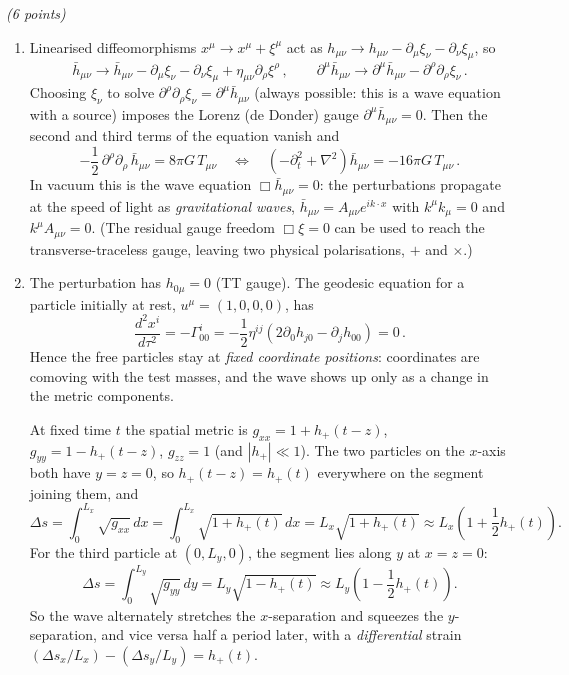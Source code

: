 \documentclass[12pt]{article}
\newcommand{\be}{\begin{equation}}
\newcommand{\ee}{\end{equation}}
\newcommand{\bh}{\bar{h}}
\newcounter{quesno}
\newcommand{\ques}[1]{\vspace{2em}\stepcounter{quesno}
\noindent{\bf Question \thequesno.} \emph{(#1 points)\\}
}
\begin{document}
\ques{6}
\begin{enumerate}[label=\alph*)]
\item Linearised diffeomorphisms $x^\mu\to x^\mu+\xi^\mu$ act as $h_{\mu\nu}\to h_{\mu\nu}-\partial_\mu\xi_\nu-\partial_\nu\xi_\mu$, so
\be
\bh_{\mu\nu}\to\bh_{\mu\nu}-\partial_\mu\xi_\nu-\partial_\nu\xi_\mu+\eta_{\mu\nu}\partial_\rho\xi^\rho\,,\qquad
\partial^\mu\bh_{\mu\nu}\to\partial^\mu\bh_{\mu\nu}-\partial^\rho\partial_\rho\xi_\nu\,.
\ee
Choosing $\xi_\nu$ to solve $\partial^\rho\partial_\rho\xi_\nu=\partial^\mu\bh_{\mu\nu}$ (always possible: this is a wave equation with a source) imposes the Lorenz (de Donder) gauge $\partial^\mu\bh_{\mu\nu}=0$. Then the second and third terms of the equation vanish and
\be
-\frac12\,\partial^\rho\partial_\rho\,\bh_{\mu\nu}=8\pi G\,T_{\mu\nu}\quad\Longleftrightarrow\quad
\left(-\partial_t^2+\nabla^2\right)\bh_{\mu\nu}=-16\pi G\,T_{\mu\nu}\,.
\ee
In vacuum this is the wave equation $\Box\bh_{\mu\nu}=0$: the perturbations propagate at the speed of light as \emph{gravitational waves}, $\bh_{\mu\nu}=A_{\mu\nu}e^{ik\cdot x}$ with $k^\mu k_\mu=0$ and $k^\mu A_{\mu\nu}=0$. (The residual gauge freedom $\Box\xi=0$ can be used to reach the transverse-traceless gauge, leaving two physical polarisations, $+$ and $\times$.)

\item The perturbation has $h_{0\mu}=0$ (TT gauge). The geodesic equation for a particle initially at rest, $u^\mu=(1,0,0,0)$, has
\be
\frac{d^2x^i}{d\tau^2}=-\Gamma^i_{00}=-\frac12\eta^{ij}\left(2\partial_0h_{j0}-\partial_jh_{00}\right)=0\,.
\ee
Hence the free particles stay at \emph{fixed coordinate positions}: coordinates are comoving with the test masses, and the wave shows up only as a change in the metric components.

At fixed time $t$ the spatial metric is $g_{xx}=1+h_+(t-z)$, $g_{yy}=1-h_+(t-z)$, $g_{zz}=1$ (and $|h_+|\ll1$). The two particles on the $x$-axis both have $y=z=0$, so $h_+(t-z)=h_+(t)$ everywhere on the segment joining them, and
\be
\Delta s=\int_0^{L_x}\sqrt{g_{xx}}\,dx=\int_0^{L_x}\sqrt{1+h_+(t)}\,dx=L_x\sqrt{1+h_+(t)}\approx L_x\left(1+\frac12h_+(t)\right).
\ee
For the third particle at $(0,L_y,0)$, the segment lies along $y$ at $x=z=0$:
\be
\Delta s=\int_0^{L_y}\sqrt{g_{yy}}\,dy=L_y\sqrt{1-h_+(t)}\approx L_y\left(1-\frac12h_+(t)\right).
\ee
So the wave alternately stretches the $x$-separation and squeezes the $y$-separation, and vice versa half a period later, with a \emph{differential} strain $(\Delta s_x/L_x)-(\Delta s_y/L_y)=h_+(t)$.


\end{enumerate}
\end{document}
